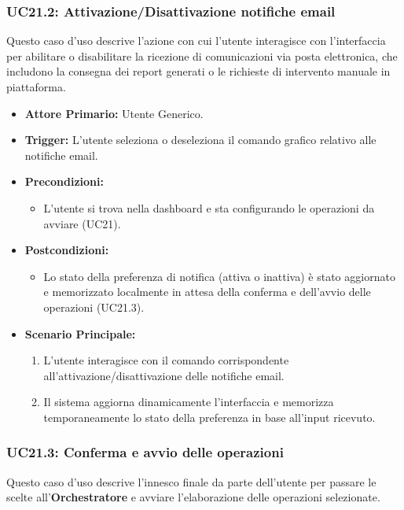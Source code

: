 \documentclass[12pt, a4paper]{article}
\begin{document}
\subsubsection{UC21.2: Attivazione/Disattivazione notifiche email}\label{uc:21.2}
Questo caso d'uso descrive l'azione con cui l'utente interagisce con l'interfaccia per abilitare o disabilitare la ricezione di comunicazioni via posta elettronica, che includono la consegna dei report generati o le richieste di intervento manuale in piattaforma.

\begin{itemize}
    \item \textbf{Attore Primario:} Utente Generico.
    \item \textbf{Trigger:} L'utente seleziona o deseleziona il comando grafico relativo alle notifiche email.
    \item \textbf{Precondizioni:}
    \begin{itemize}
        \item L'utente si trova nella dashboard e sta configurando le operazioni da avviare (UC21).
    \end{itemize}
    \item \textbf{Postcondizioni:}
    \begin{itemize}
        \item Lo stato della preferenza di notifica (attiva o inattiva) è stato aggiornato e memorizzato localmente in attesa della conferma e dell'avvio delle operazioni (UC21.3).
    \end{itemize}
    \item \textbf{Scenario Principale:}
    \begin{enumerate}
        \item L'utente interagisce con il comando corrispondente all'attivazione/disattivazione delle notifiche email.
        \item Il sistema aggiorna dinamicamente l'interfaccia e memorizza temporaneamente lo stato della preferenza in base all'input ricevuto.
    \end{enumerate}
\end{itemize}

\newpage
\subsubsection{UC21.3: Conferma e avvio delle operazioni}\label{uc:21.3}
Questo caso d'uso descrive l'innesco finale da parte dell'utente per passare le scelte all'\textbf{Orchestratore} e avviare l'elaborazione delle operazioni selezionate.
\end{document}
